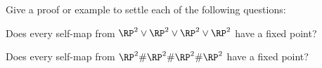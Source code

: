 Give a proof or example to settle each of the following questions:
\begin{alist}
\item Does every self-map from $\RP^2\vee \RP^2\vee \RP^2\vee \RP^2$
have a fixed point?
\item Does every self-map from $\RP^2\# \RP^2\# \RP^2\# \RP^2$
have a fixed point?
\end{alist}
